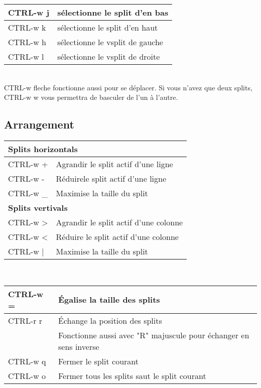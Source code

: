 \documentclass{article}
\begin{document}
\begin{tabular}{|p{3cm}| l| }\hline
CTRL-w j & sélectionne le split d'en bas\\ \hline
CTRL-w k & sélectionne le split d'en haut\\ \hline
CTRL-w h & sélectionne le vsplit de gauche\\ \hline
CTRL-w l & sélectionne le vsplit de droite\\ \hline
\end{tabular}\\

\noindent
 CTRL-w fleche fonctionne aussi pour se déplacer. Si vous n'avez que deux splits, CTRL-w w vous permettra de basculer de l'un à l'autre.
\subsection{Arrangement}

\begin{tabular}{|p{3cm}| l| }\hline
\multicolumn{2}{|l|}{\textbf{Splits horizontals}} \\ \hline
    CTRL-w + & Agrandir le split actif d'une ligne\\ \hline
    CTRL-w - & Réduirele split actif d'une ligne\\ \hline
    CTRL-w \_ & Maximise la taille du split\\ \hline
\multicolumn{2}{|l|}{\textbf{Splits vertivals}}\\ \hline
    CTRL-w > & Agrandir le split actif d'une colonne \\ \hline
    CTRL-w < & Réduire le split actif d'une colonne \\ \hline
    CTRL-w | & Maximise la taille du split\\ \hline
\end{tabular}\\[1.5em]


\begin{tabular}{|p{3cm}| l| }\hline
    CTRL-w = & Égalise la taille des splits \\ \hline
    CTRL-r r & Échange la position des splits\\
    & Fonctionne aussi avec "R" majuscule pour échanger en sens inverse \\ \hline
    CTRL-w q & Fermer le split courant \\ \hline
    CTRL-w o & Fermer tous les splits saut le split courant \\ \hline
\end{tabular}\\
\end{document}
